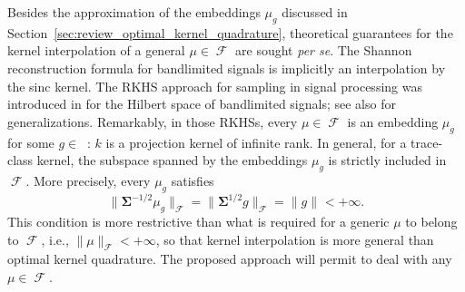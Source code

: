\documentclass[twoside,11pt]{book}
\numberwithin{theorem}{chapter}
\numberwithin{definition}{chapter}
\numberwithin{proposition}{chapter}
\numberwithin{corollary}{chapter}
\numberwithin{example}{chapter}
\numberwithin{lemma}{chapter}
\DeclareMathOperator{\F}{\mathcal{F}}
\DeclareMathOperator{\Ltwo}{\mathbb{L}_{2}(\mathrm{d} \omega)}
\newcommand{\pc}[1]{\textcolor{blue}{#1}}
\begin{document}
Besides the approximation of the embeddings $\mu_{g}$ discussed in Section~\ref{sec:review_optimal_kernel_quadrature}, theoretical guarantees for the kernel interpolation of a general $\mu\in\F$ are sought \emph{per se}. The Shannon reconstruction formula for bandlimited signals \citep{Sha48} is implicitly an interpolation by the sinc kernel.
The RKHS approach for sampling in signal processing was introduced in \citep{Yao67} for the Hilbert space of bandlimited signals;
see also \citep{NaWa91} for generalizations.
Remarkably, in those RKHSs, every $\mu \in \F$ is an embedding $\mu_{g}$ for some $g \in \Ltwo$: $k$ is a projection kernel of infinite rank. In general, for a trace-class kernel, the subspace spanned by the embeddings $\mu_{g}$ is strictly included in $\F$. More precisely, every $\mu_{g}$ satisfies
\begin{equation}
\|\bm{\Sigma}^{-1/2} \mu_{g}\|_{\F} = \|\bm{\Sigma}^{1/2} g\|_{\F} = \|g\|_{\Ltwo} < +\infty.
\end{equation}
This condition is more restrictive than what is required for a generic $\mu$ to belong to $\F$, i.e., $\|\mu\|_{\F}< +\infty$, so that kernel interpolation is more general than optimal kernel quadrature. The proposed approach will permit to deal with any $\mu\in\F$.








%
\end{document}

